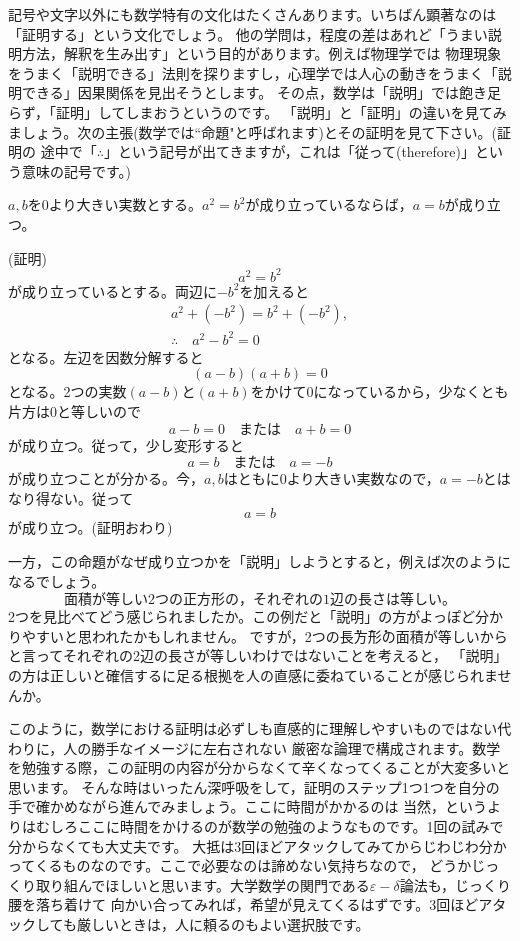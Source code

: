 \documentclass[./main]{subfiles}
\begin{document}
記号や文字以外にも数学特有の文化はたくさんあります。いちばん顕著なのは「証明する」という文化でしょう。
他の学問は，程度の差はあれど「うまい説明方法，解釈を生み出す」という目的があります。例えば物理学では
物理現象をうまく「説明できる」法則を探りますし，心理学では人心の動きをうまく「説明できる」因果関係を見出そうとします。
その点，数学は「説明」では飽き足らず，「証明」してしまおうというのです。
「説明」と「証明」の違いを見てみましょう。次の主張(数学では``命題"と呼ばれます)とその証明を見て下さい。(証明の
途中で「$\therefore$」という記号が出てきますが，これは「従って(therefore)」という意味の記号です。)

\begin{thm}
$a,b$を0より大きい実数とする。$a^2 = b^2$が成り立っているならば，$a = b$が成り立つ。
\end{thm}
(証明)
\[a^2 = b^2 \]
が成り立っているとする。両辺に$-b^2$を加えると
\begin{gather*}
a^2 + (-b^2) = b^2 + (-b^2), \\
\therefore \quad a^2 - b^2 = 0
\end{gather*}
となる。左辺を因数分解すると
\[
(a-b)(a+b) = 0
\]
となる。2つの実数$(a-b)と(a+b)$をかけて0になっているから，少なくとも片方は0と等しいので
\[
a-b=0 \quad または\quad a+b=0
\]
が成り立つ。従って，少し変形すると
\[
a=b \quad または \quad a=-b
\]
が成り立つことが分かる。今，$a,b$はともに0より大きい実数なので，$a=-b$とはなり得ない。従って
\[
a=b
\]
が成り立つ。(証明おわり)

一方，この命題がなぜ成り立つかを「説明」しようとすると，例えば次のようになるでしょう。
\[
面積が等しい2つの正方形の，それぞれの1辺の長さは等しい。
\]
2つを見比べてどう感じられましたか。この例だと「説明」の方がよっぽど分かりやすいと思われたかもしれません。
ですが，2つの\.{長}\.{方}\.{形}の面積が等しいからと言ってそれぞれの2辺の長さが等しいわけではないことを考えると，
「説明」の方は正しいと確信するに足る根拠を人の直感に委ねていることが感じられませんか。

このように，数学における証明は必ずしも直感的に理解しやすいものではない代わりに，人の勝手なイメージに左右されない
厳密な論理で構成されます。数学を勉強する際，この証明の内容が分からなくて辛くなってくることが大変多いと思います。
そんな時はいったん深呼吸をして，証明のステップ1つ1つを自分の手で確かめながら進んでみましょう。ここに時間がかかるのは
当然，というよりはむしろここに時間をかけるのが数学の勉強のようなものです。1回の試みで分からなくても大丈夫です。
大抵は3回ほどアタックしてみてからじわじわ分かってくるものなのです。ここで必要なのは諦めない気持ちなので，
どうかじっくり取り組んでほしいと思います。大学数学の関門である$\varepsilon-\delta$論法も，じっくり腰を落ち着けて
向かい合ってみれば，希望が見えてくるはずです。3回ほどアタックしても厳しいときは，人に頼るのもよい選択肢です。
\end{document}
